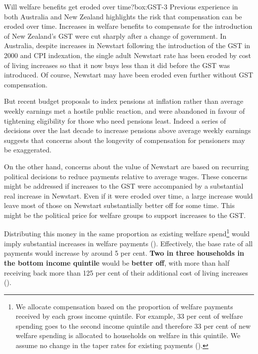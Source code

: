 \begin{smallbox}{Will welfare benefits get eroded over time?}{box:GST-3}
Previous experience in both Australia and New Zealand highlights the risk that compensation can be eroded over time. Increases in welfare benefits to compensate for the introduction of New Zealand’s GST were cut sharply after a change of government. In Australia, despite increases in Newstart following the introduction of the GST in 2000 and CPI indexation, the single adult Newstart rate has been eroded by cost of living increases so that it now buys less than it did before the GST was introduced.  Of course, Newstart may have been eroded even further without GST compensation.

But recent budget proposals to index pensions at inflation rather than average weekly earnings met a hostile public reaction, and were abandoned in favour of tightening eligibility for those who need pensions least.  Indeed a series of decisions over the last decade to increase pensions above average weekly earnings  suggests that concerns about the longevity of compensation for pensioners may be exaggerated.

On the other hand, concerns about the value of Newstart are based on recurring political decisions to reduce payments relative to average wages. These concerns might be addressed if increases to the GST were accompanied by a substantial real increase in Newstart. Even if it were eroded over time, a large increase would leave most of those on Newstart substantially better off for some time. This might be the political price for welfare groups to support increases to the GST. 
\end{smallbox}

Distributing this money in the same proportion as existing welfare spend\footnote{We allocate compensation based on the proportion of welfare payments received by each gross income quintile. For example, 33 per cent of welfare spending goes to the second income quintile and therefore 33 per cent of new welfare spending is allocated to households on welfare in this quintile. We assume no change in the taper rates for existing payments ().}  would imply substantial increases in welfare payments (). Effectively, the base rate of all payments would increase by around 5 per cent. \textbf{Two in three households in the bottom income quintile} would be \textbf{better off}, with more than half receiving back more than 125 per cent of their additional cost of living increases ().

